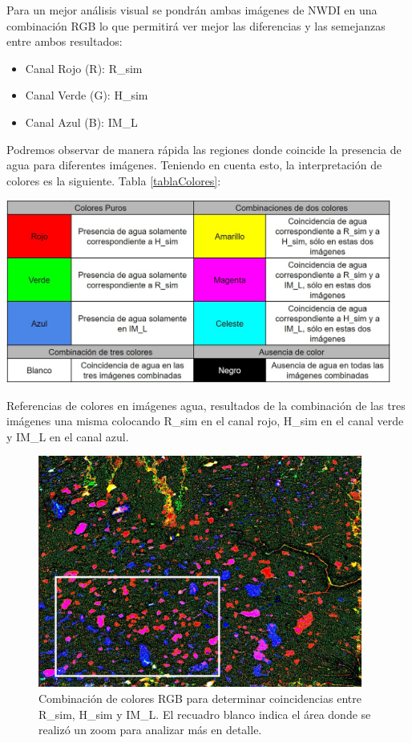 \documentclass[10pt,a4paper, twoside]{report}
\begin{document}
Para un mejor análisis visual se pondrán ambas imágenes de NWDI en una combinación RGB lo que permitirá ver mejor las diferencias y las semejanzas entre ambos resultados:

\begin{itemize}
	\item Canal Rojo (R): R\_sim
	\item Canal Verde (G): H\_sim
	\item Canal Azul (B): IM\_L
\end{itemize}

Podremos observar de manera rápida las regiones donde coincide la presencia de agua para diferentes imágenes. Teniendo en cuenta esto, la interpretación de colores es la siguiente. Tabla \ref{tablaColores}:

\begin{table}[H]
   \centering      
   \includegraphics[width=0.95\textwidth]{imagenes/tablaColores.jpg}
 \caption{Referencias de colores en imágenes agua, resultados de la combinación de las tres imágenes una misma colocando R\_sim en el canal rojo, H\_sim en el canal verde y IM\_L en el canal azul.}
 \label{tablaColores}
\end{table}

\begin{figure}[!htb]
   \centering      
   \includegraphics[width=0.95\textwidth]{imagenes/RGBDia10.jpg}
 \caption{Combinación de colores RGB para determinar coincidencias entre R\_sim, H\_sim y IM\_L. El recuadro blanco indica el área donde se realizó un zoom para analizar más en detalle.}
 \label{RGBDia10}
\end{figure}
\end{document}
